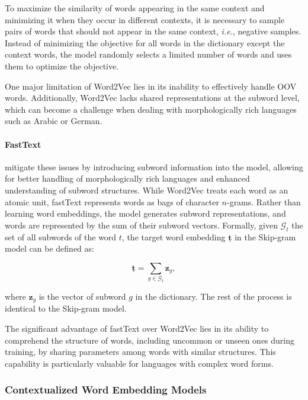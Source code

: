 To maximize the similarity of words appearing in the same context and minimizing it when they occur in different contexts, it is necessary to sample pairs of words that should not appear in the same context, \textit{i.e.}, negative samples. Instead of minimizing the objective for all words in the dictionary except the context words, the model randomly selects a limited number of words and uses them to optimize the objective. 

One major limitation of Word2Vec lies in its inability to effectively handle \ac{OOV} words. Additionally, Word2Vec lacks shared representations at the subword level, which can become a challenge when dealing with morphologically rich languages such as Arabic or German.

\paragraph{FastText}  \citet{bojanowski2017enriching} mitigate these issues by introducing subword information into the model, allowing for better handling of morphologically rich languages and enhanced understanding of subword structures. While Word2Vec treats each word as an atomic unit, fastText represents words as bags of character $n$-grams. Rather than learning word embeddings, the model generates subword representations, and words are represented by the sum of their subword vectors. Formally, given $\mathcal{G}_t$ the set of all subwords of the word $t$, the target word embedding $\bm{\underline{t}}$ in the Skip-gram model can be defined as:

\begin{equation}
    \bm{\underline{t}} = \sum_{g \in \mathcal{G}_t} \bm{z}_g,
\end{equation}

where $\bm{z}_g$ is the vector of subword $g$ in the dictionary. The rest of the process is identical to the Skip-gram model.

The significant advantage of fastText over Word2Vec lies in its ability to comprehend the structure of words, including uncommon or unseen ones during training, by sharing parameters among words with similar structures. This capability is particularly valuable for languages with complex word forms.

\subsubsection{Contextualized Word Embedding Models}

